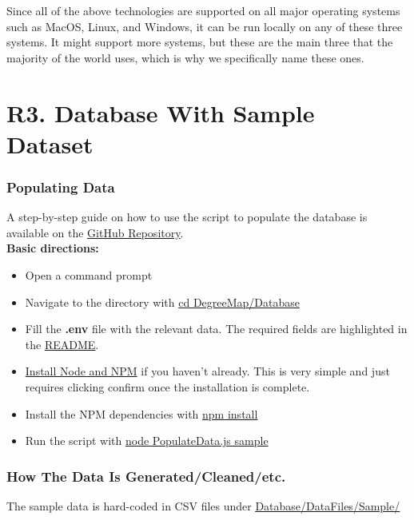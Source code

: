 \documentclass[12pt, a4paper]{article}
\begin{document}
Since all of the above technologies are supported on all major operating systems such as MacOS, Linux, and Windows, it can be run locally on any of these three systems. It might support more systems, but these are the main three that the majority of the world uses, which is why we specifically name these ones.

\section*{R3. Database With Sample Dataset}
\label{sec:R3}

\subsubsection*{Populating Data}
A step-by-step guide on how to use the script to populate the database is available on the \underline{\href{https://github.com/Kggupta/DegreeMap/blob/main/README.md}{GitHub Repository}}.\\
\textbf{Basic directions:}
\begin{itemize}
    \item Open a command prompt
    \item Navigate to the directory with \underline{cd DegreeMap/Database}
    \item Fill the \textbf{.env} file with the relevant data. The required fields are highlighted in the \underline{\href{https://github.com/Kggupta/DegreeMap/blob/main/README.md}{README}}.
    \item \href{https://nodejs.org/en/download}{Install Node and NPM} if you haven't already. This is very simple and just requires clicking confirm once the installation is complete.
    \item Install the NPM dependencies with \underline{npm install}
    \item Run the script with
    \underline{node PopulateData.js sample}
\end{itemize}
\subsubsection*{How The Data Is Generated/Cleaned/etc.}
The sample data is hard-coded in CSV files under \underline{\href{https://github.com/Kggupta/DegreeMap/tree/main/Database/DataFiles/Sample}{Database/DataFiles/Sample/}}\\
\end{document}
